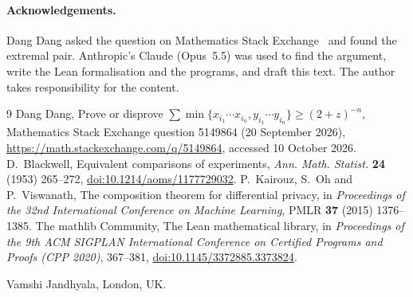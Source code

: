 \documentclass[11pt]{article}
\theoremstyle{remark}
\begin{document}
\paragraph{Acknowledgements.} Dang Dang asked the question on Mathematics Stack Exchange~\cite{MSE} and found
the extremal pair. Anthropic's Claude (Opus~5.5) was used to find the argument, write the Lean formalisation
and the programs, and draft this text. The author takes responsibility for the content.

\begin{thebibliography}{9}
 Dang Dang, Prove or disprove $\sum\min\{x_{i_1}\cdots x_{i_n},y_{i_1}\cdots y_{i_n}\}\ge(2+z)^{-n}$,
Mathematics Stack Exchange question 5149864 (20 September 2026),
\url{https://math.stackexchange.com/q/5149864}, accessed 10 October 2026.
 D.~Blackwell, Equivalent comparisons of experiments, \emph{Ann. Math. Statist.} \textbf{24}
(1953) 265--272, \href{https://doi.org/10.1214/aoms/1177729032}{doi:10.1214/aoms/1177729032}.
 P.~Kairouz, S.~Oh and P.~Viswanath, The composition theorem for differential privacy, in
\emph{Proceedings of the 32nd International Conference on Machine Learning}, PMLR \textbf{37} (2015) 1376--1385.
 The mathlib Community, The Lean mathematical library, in \emph{Proceedings of the 9th ACM
SIGPLAN International Conference on Certified Programs and Proofs (CPP 2020)}, 367--381,
\href{https://doi.org/10.1145/3372885.3373824}{doi:10.1145/3372885.3373824}.
\end{thebibliography}

\bigskip
\noindent Vamshi Jandhyala, London, UK.
\end{document}

